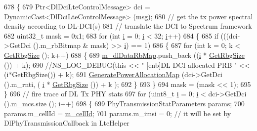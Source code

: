 \begin{DoxyCode}
678             \{
679               Ptr<DlDciLteControlMessage> dci = DynamicCast<DlDciLteControlMessage> (msg);
680               \textcolor{comment}{// get the tx power spectral density according to DL-DCI(s)}
681               \textcolor{comment}{// translate the DCI to Spectrum framework}
682               uint32\_t mask = 0x1;
683               \textcolor{keywordflow}{for} (\textcolor{keywordtype}{int} \hyperlink{bernuolliDistribution_8m_a6f6ccfcf58b31cb6412107d9d5281426}{i} = 0; \hyperlink{bernuolliDistribution_8m_a6f6ccfcf58b31cb6412107d9d5281426}{i} < 32; \hyperlink{bernuolliDistribution_8m_a6f6ccfcf58b31cb6412107d9d5281426}{i}++)
684                 \{
685                   \textcolor{keywordflow}{if} (((dci->GetDci ().m\_rbBitmap & mask) >> \hyperlink{bernuolliDistribution_8m_a6f6ccfcf58b31cb6412107d9d5281426}{i}) == 1)
686                     \{
687                       \textcolor{keywordflow}{for} (\textcolor{keywordtype}{int} k = 0; k < \hyperlink{classns3_1_1LtePhy_a0b43cc13670b730fce0b55c8e0db60d9}{GetRbgSize} (); k++)
688                         \{
689                           \hyperlink{classns3_1_1LteEnbPhy_a3fb8cd42886925222a259b135fa0c5e4}{m\_dlDataRbMap}.push\_back ((\hyperlink{bernuolliDistribution_8m_a6f6ccfcf58b31cb6412107d9d5281426}{i} * \hyperlink{classns3_1_1LtePhy_a0b43cc13670b730fce0b55c8e0db60d9}{GetRbgSize} ()) + k);
690                           \textcolor{comment}{//NS\_LOG\_DEBUG(this << " [enb]DL-DCI allocated PRB " << (i*GetRbgSize()) + k);}
691                           \hyperlink{classns3_1_1LteEnbPhy_a945fdbbd3252b1e7acd7abf830692157}{GeneratePowerAllocationMap} (dci->GetDci ().m\_rnti, (
      \hyperlink{bernuolliDistribution_8m_a6f6ccfcf58b31cb6412107d9d5281426}{i} * \hyperlink{classns3_1_1LtePhy_a0b43cc13670b730fce0b55c8e0db60d9}{GetRbgSize} ()) + k );
692                         \}
693                     \}
694                   mask = (mask << 1);
695                 \}
696               \textcolor{comment}{// fire trace of DL Tx PHY stats}
697               \textcolor{keywordflow}{for} (uint8\_t \hyperlink{bernuolliDistribution_8m_a6f6ccfcf58b31cb6412107d9d5281426}{i} = 0; \hyperlink{bernuolliDistribution_8m_a6f6ccfcf58b31cb6412107d9d5281426}{i} < dci->GetDci ().m\_mcs.size (); \hyperlink{bernuolliDistribution_8m_a6f6ccfcf58b31cb6412107d9d5281426}{i}++)
698                 \{
699                   PhyTransmissionStatParameters params;
700                   params.m\_cellId = \hyperlink{classns3_1_1LtePhy_ac53d10d27f1bde64807a3ff366662787}{m\_cellId};
701                   params.m\_imsi = 0; \textcolor{comment}{// it will be set by DlPhyTransmissionCallback in LteHelper}

\end{DoxyCode}
